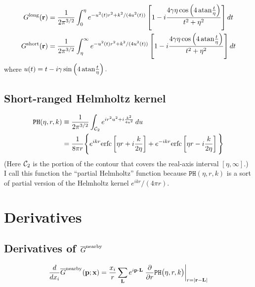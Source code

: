 \documentclass[letterpaper]{article}
\newcommand{\GB}{\overline{G}}
\newcommand{\erfc}{\text{erfc}}
\begin{document}
\begin{align*}
 G^{\hbox{\scriptsize{long}}}(\mathbf{r}) 
&=\frac{1}{2\pi^{3/2}} 
  \int_0^\eta e^{-u^2(t) r^2 + k^2/(4u^2(t))}
  \left[ 1 - i\frac{4 \gamma \eta \cos\left(4\, \text{atan} \frac{t}{\eta}\right)}
                   {t^2 + \eta^2}
  \right] dt
\\
 G^{\hbox{\scriptsize{short}}}(\mathbf{r}) 
&=\frac{1}{2\pi^{3/2}} 
  \int_\eta^\infty e^{-u^2(t) r^2 + k^2/(4u^2(t))}
  \left[ 1 - i\frac{4 \gamma \eta \cos\left(4\, \text{atan} \frac{t}{\eta}\right)}
                   {t^2 + \eta^2}
  \right] dt
\end{align*}
where $u(t)=t-i\gamma\sin\left(4\,\text{atan}\frac{t}{\eta}\right).$

\subsection*{Short-ranged Helmholtz kernel}

\begin{align}
  \texttt{PH}(\eta,r,k)
  &\equiv
  \frac{1}{2\pi^{3/2}}
  \int_{\mc C_2} e^{ ir^2 u^2 + i\frac{k^2}{4u^2}}\, du
\nn
  &=
   \frac{1}{8\pi r}
     \Bigg\{ e^{ ikr} \erfc\left[  \eta r
                                 +i\frac{k}{2\eta}\right]
            +e^{-ikr} \erfc\left[  \eta r 
                                 -i\frac{k}{2\eta}\right]
     \Bigg\}
  \label{PHDefinition}
\end{align}
(Here $\mathcal{C}_2$ is the portion of the contour that 
covers the real-axis interval $[\eta,\infty]$.)
I call this function the ``partial Helmholtz'' function 
because $\texttt{PH}(\eta, r, k)$ is a sort of partial
version of the Helmholtz kernel $e^{ikr}/(4\pi r).$

\section{Derivatives}

\subsection{Derivatives of $\GB\sups{nearby}$}

\begin{align*}
 \frac{d}{dx_i} \GB\sups{nearby}(\vb p; \vb x)
& = \frac{x_i}{r} \sum_{\vb L} 
    e^{i \vb p \cdot \vb L}
    \left. \pard{}{r} \texttt{PH}\big(\eta, r, k\big)
    \right|_{r=|\vb r - \vb L|}
\\
\end{align*}
\end{document}
